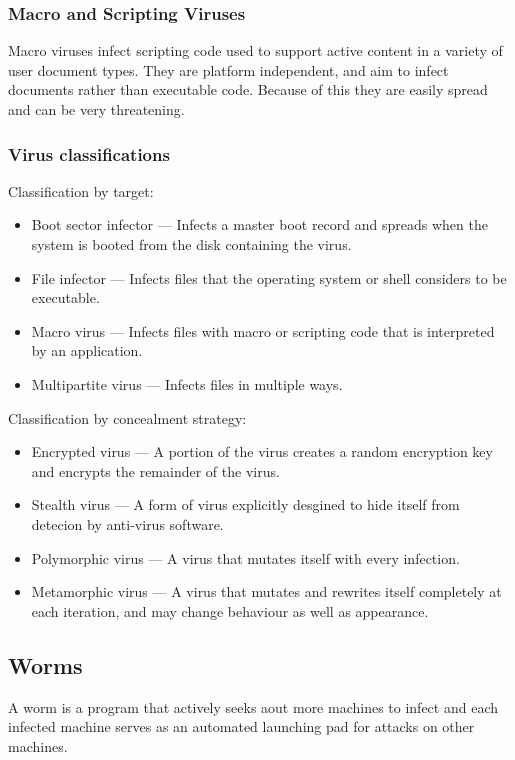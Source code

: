 \subsubsection{Macro and Scripting Viruses}
Macro viruses infect scripting code used to support active content in a variety of user document types.
They are platform independent, and aim to infect documents rather than executable code. Because of this they are easily spread and can be very threatening.

\subsubsection{Virus classifications}
Classification by target:
\begin{itemize}
    \item Boot sector infector --- Infects a master boot record and spreads when the system is booted from the disk containing the virus.
    \item File infector --- Infects files that the operating system or shell considers to be executable.
    \item Macro virus --- Infects files with macro or scripting code that is interpreted by an application.
    \item Multipartite virus --- Infects files in multiple ways.
\end{itemize}

Classification by concealment strategy:
\begin{itemize}
    \item Encrypted virus --- A portion of the virus creates a random encryption key and encrypts the remainder of the virus.
    \item Stealth virus --- A form of virus explicitly desgined to hide itself from detecion by anti-virus software.
    \item Polymorphic virus --- A virus that mutates itself with every infection.
    \item Metamorphic virus --- A virus that mutates and rewrites itself completely at each iteration, and may change behaviour as well as appearance.
\end{itemize}


\subsection{Worms}
A worm is a program that actively seeks aout more machines to infect and each infected machine serves as an automated launching pad for attacks on other machines.

